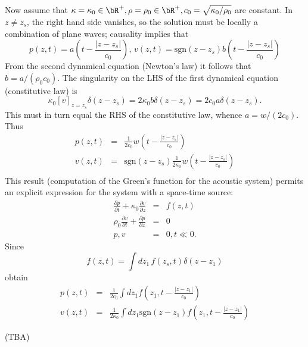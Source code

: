 Now assume that $\kappa=\kappa_0 \in \bR^+, \rho=\rho_0 \in \bR^+, c_0
= \sqrt{\kappa_0/\rho_0}$ are constant. 
In $z \ne z_s$, the right hand side 
vanishes, so the solution must be locally a combination of plane
waves; causality implies that
\[
p(z,t)=a\left(t -\frac{|z-z_s|}{c_0}\right), \, v(z,t)=\mbox{sgn}(z-z_s) b\left(t -
  \frac{|z-z_s|}{c_0}\right)
\]
From the second dynamical equation (Newton's law) it follows that $b =
a/(\rho_0 c_0)$. The singularity on the LHS of the first dynamical
equation (constitutive law) is
\[
\kappa_0 [v]_{z=z_s}\delta(z-z_s) =
2\kappa_0 b\delta(z-z_s) = 2c_0 a\delta(z-z_s).
\] 
This must in turn equal the RHS of the constitutive law, whence
$a=w/(2c_0)$. Thus
\begin{eqnarray}
\label{eqn:sol1dptsrc}
p(z,t) &=& \frac{1}{2c_0}w\left(t - \frac{|z-z_s|}{c_0}\right) \nonumber \\
v(z,t) &=& \mbox{sgn}(z-z_s)\frac{1}{2\kappa_0}w\left(t -\frac{|z-z_s|}{c_0}\right)
           \nonumber \\
\end{eqnarray}
This result (computation of the Green's function for the acoustic
system) permits an explicit expression for the system with a
space-time source:
\begin{eqnarray}
\label{eqn:awe1d}
\frac{\partial p}{\partial t} +\kappa_0\frac{\partial 
  v}{\partial z} &=& f(z,t) \nonumber\\
\rho_0 \frac{\partial v}{\partial t} + \frac{\partial p}{\partial 
  z}&=&0\nonumber\\
 p,v&=&0, t \ll 0. 
\end{eqnarray}
Since
\[
  f(z,t) = \int dz_1\,f(z_s,t)\delta(z-z_1)
\]
obtain
\begin{eqnarray}
\label{eqn:sol1dp}
p(z,t) &=& \frac{1}{2c_0}\int dz_1 f\left(z_1,t -
           \frac{|z-z_1|}{c_0}\right) \\
  \label{eqn:sol1dv}
v(z,t) &=& \frac{1}{2\kappa_0} \int dz_1 \mbox{sgn} (z-z_1) f\left(z_1,t - \frac{|z-z_1|}{c_0}\right)
\end{eqnarray}


(TBA)


